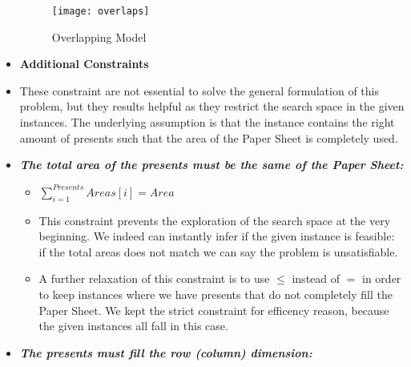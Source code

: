 \begin{itemize}
        \begin{figure}[ht]
            \centering
            \texttt{[image: overlaps]}
            \caption{Overlapping Model}
            \label{fig:overlaps}
        \end{figure}

    \item[] \textbf{Additional Constraints}
    \item[] These constraint are not essential to solve the general formulation of this problem,
        but they results helpful as they restrict the search space in the given instances.
        The underlying assumption is that the instance contains the right amount of presents such
        that the area of the Paper Sheet is completely used.
    \item \textbf{\textit{The total area of the presents must be the same of the Paper Sheet:}}
        \begin{itemize}
            \item[] $\sum_{i = 1}^{Presents}{Areas[i]} = Area$
            \item[] This constraint prevents the exploration of the search space
                at the very beginning. We indeed can instantly infer if the given instance is
                feasible: if the total areas does not match we can say the problem is unsatisfiable.
            \item[] A further relaxation of this constraint is to use $\leq$ instead of $=$ in order 
                to keep instances where we have presents that do not completely fill the Paper Sheet. 
                We kept the strict constraint for efficency reason, because the given instances all fall
                in this case.
        \end{itemize}
    \item \textbf{\textit{The presents must fill the row (column) dimension:}}
\end{itemize}
